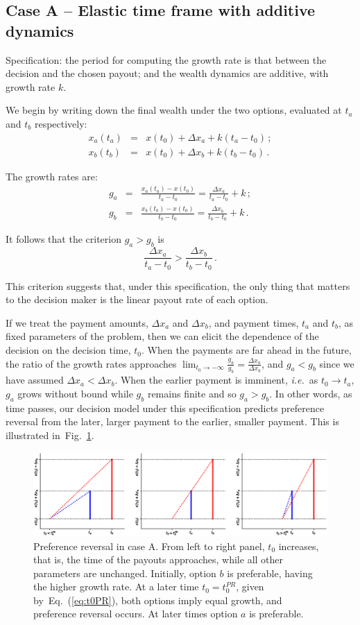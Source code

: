 \documentclass[11pt]{article}
\newcommand{\eref}[1]{Eq.~(\ref{eq:#1})}
\newcommand{\ie}{{\it i.e.}\ }
\newcommand{\flabel}[1]{\label{fig:#1}}
\newcommand{\fref}[1]{Fig.~\ref{fig:#1}}
\newcommand{\be}{\begin{equation}}
\newcommand{\ee}{\end{equation}}
\newcommand{\bea}{\begin{eqnarray}}
\newcommand{\eea}{\end{eqnarray}}
\newcommand{\Dx}{\Delta x}
\numberwithin{equation}{section}
\begin{document}
\subsection{Case A -- Elastic time frame with additive dynamics}\label{sec:case_A}

Specification: the period for computing the growth rate is that between the decision and the chosen payout; and the wealth dynamics are additive, with growth rate $k$.

We begin by writing down the final wealth under the two options, evaluated at $t_a$ and $t_b$ respectively:
\bea
x_a\left(t_a\right) &=& x\left(t_0\right) + \Dx_a + k(t_a-t_0)\,;\\
x_b\left(t_b\right) &=& x\left(t_0\right) + \Dx_b + k(t_b-t_0)\,.
\eea

The growth rates are:
\bea
g_a &=& \frac{x_a\left(t_a\right) - x\left(t_0\right)}{t_a-t_0} = \frac{\Dx_a}{t_a-t_0} + k\,;\\
g_b &=& \frac{x_b\left(t_b\right) - x\left(t_0\right)}{t_b-t_0} = \frac{\Dx_b}{t_b-t_0} + k\,.
\eea

It follows that the criterion $g_a > g_b$ is
\be
\frac{\Dx_a}{t_a-t_0} > \frac{\Dx_b}{t_b-t_0}\,.
\ee

This criterion suggests that, under this specification, the only thing that matters to the decision maker is the linear payout rate of each option.

If we treat the payment amounts, $\Dx_a$ and $\Dx_b$, and payment times, $t_a$ and $t_b$, as fixed parameters of the problem, then we can elicit the dependence of the decision on the decision time, $t_0$. When the payments are far ahead in the future, the ratio of the growth rates approaches $\lim_{t_0\to-\infty}\frac{g_a}{g_b}=\frac{\Dx_a}{\Dx_b}$, and $g_a<g_b$ since we have assumed $\Dx_a<\Dx_b$. When the earlier payment is imminent, \ie as $t_0\to t_a$, $g_a$ grows without bound while $g_b$ remains finite and so $g_a>g_b$. In other words, as time passes, our decision model under this specification predicts preference reversal from the later, larger payment to the earlier, smaller payment. This is illustrated in~\fref{caseA}.

\begin{figure}[!htb]
\centering
\includegraphics[width=1.0\textwidth]{./figures/reversals.eps}
\caption{Preference reversal in case A. From left to right panel, $t_0$ increases, that is, the time of the payouts approaches, while all other parameters are unchanged. Initially, option $b$ is preferable, having the higher growth rate. At a later time $t_0=t_0^{PR}$, given by~\eref{t0PR}, both options imply equal growth, and preference reversal occurs. At later times option $a$ is preferable.}
\flabel{caseA}
\end{figure}
\end{document}
